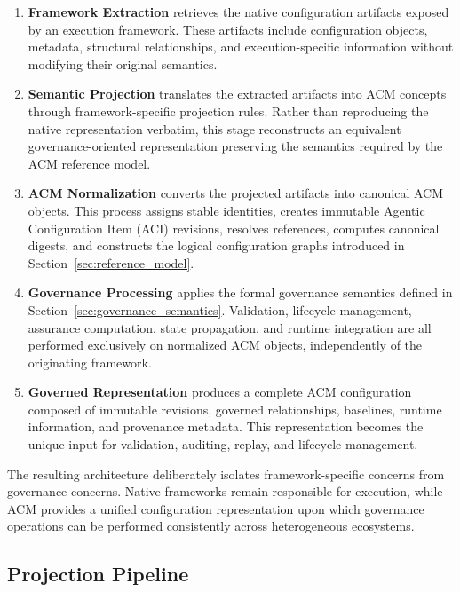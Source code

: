 \documentclass[10pt]{article}
\begin{document}
\begin{enumerate}
    \item \textbf{Framework Extraction} retrieves the native configuration artifacts exposed by an execution framework. These artifacts include configuration objects, metadata, structural relationships, and execution-specific information without modifying their original semantics.

    \item \textbf{Semantic Projection} translates the extracted artifacts into ACM concepts through framework-specific projection rules. Rather than reproducing the native representation verbatim, this stage reconstructs an equivalent governance-oriented representation preserving the semantics required by the ACM reference model.

    \item \textbf{ACM Normalization} converts the projected artifacts into canonical ACM objects. This process assigns stable identities, creates immutable Agentic Configuration Item (ACI) revisions, resolves references, computes canonical digests, and constructs the logical configuration graphs introduced in Section~\ref{sec:reference_model}.

    \item \textbf{Governance Processing} applies the formal governance semantics defined in Section~\ref{sec:governance_semantics}. Validation, lifecycle management, assurance computation, state propagation, and runtime integration are all performed exclusively on normalized ACM objects, independently of the originating framework.

    \item \textbf{Governed Representation} produces a complete ACM configuration composed of immutable revisions, governed relationships, baselines, runtime information, and provenance metadata. This representation becomes the unique input for validation, auditing, replay, and lifecycle management.
\end{enumerate}

The resulting architecture deliberately isolates framework-specific concerns from governance concerns. Native frameworks remain responsible for execution, while ACM provides a unified configuration representation upon which governance operations can be performed consistently across heterogeneous ecosystems.

\subsection{Projection Pipeline}
\label{subsec:semantic_projection_pipeline}
\end{document}

